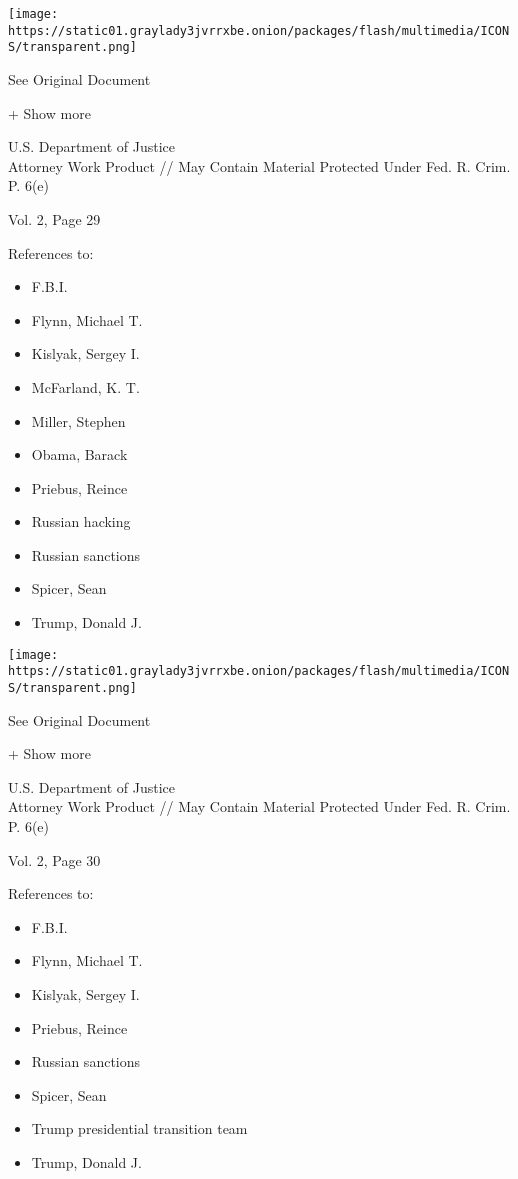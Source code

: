 \texttt{[image: https://static01.graylady3jvrrxbe.onion/packages/flash/multimedia/ICONS/transparent.png]}

See Original Document

+ Show more

U.S. Department of Justice\\
Attorney Work Product // May Contain Material Protected Under Fed. R.
Crim. P. 6(e)

Vol. 2, Page 29

References to:

\begin{itemize}
\tightlist
\item
  F.B.I.
\item
  Flynn, Michael T.
\item
  Kislyak, Sergey I.
\item
  McFarland, K. T.
\item
  Miller, Stephen
\item
  Obama, Barack
\item
  Priebus, Reince
\item
  Russian hacking
\item
  Russian sanctions
\item
  Spicer, Sean
\item
  Trump, Donald J.
\end{itemize}

\protect\hyperlink{}{}

\texttt{[image: https://static01.graylady3jvrrxbe.onion/packages/flash/multimedia/ICONS/transparent.png]}

See Original Document

+ Show more

U.S. Department of Justice\\
Attorney Work Product // May Contain Material Protected Under Fed. R.
Crim. P. 6(e)

Vol. 2, Page 30

References to:

\begin{itemize}
\tightlist
\item
  F.B.I.
\item
  Flynn, Michael T.
\item
  Kislyak, Sergey I.
\item
  Priebus, Reince
\item
  Russian sanctions
\item
  Spicer, Sean
\item
  Trump presidential transition team
\item
  Trump, Donald J.
\end{itemize}

